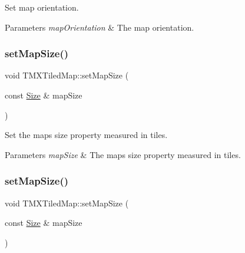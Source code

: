 Set map orientation.


\begin{DoxyParams}{Parameters}
{\em map\+Orientation} & The map orientation. \\
\hline
\end{DoxyParams}
\mbox{\label{classTMXTiledMap_a13ea26ae12da64ee6f2223cf22e8f406}} 
\subsubsection{\texorpdfstring{set\+Map\+Size()}{setMapSize()}\hspace{0.1cm}{\footnotesize\ttfamily [1/2]}}
{\footnotesize\ttfamily void T\+M\+X\+Tiled\+Map\+::set\+Map\+Size (\begin{DoxyParamCaption}\item[{const \hyperlink{classSize}{Size} \&}]{map\+Size }\end{DoxyParamCaption})\hspace{0.3cm}{\ttfamily [inline]}}

Set the map\textquotesingle{}s size property measured in tiles.


\begin{DoxyParams}{Parameters}
{\em map\+Size} & The map\textquotesingle{}s size property measured in tiles. \\
\hline
\end{DoxyParams}
\mbox{\label{classTMXTiledMap_a13ea26ae12da64ee6f2223cf22e8f406}} 
\subsubsection{\texorpdfstring{set\+Map\+Size()}{setMapSize()}\hspace{0.1cm}{\footnotesize\ttfamily [2/2]}}
{\footnotesize\ttfamily void T\+M\+X\+Tiled\+Map\+::set\+Map\+Size (\begin{DoxyParamCaption}\item[{const \hyperlink{classSize}{Size} \&}]{map\+Size }\end{DoxyParamCaption})\hspace{0.3cm}{\ttfamily [inline]}}

